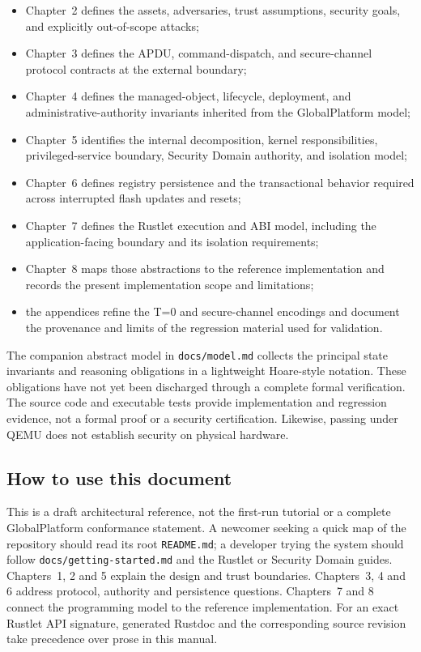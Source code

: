 \begin{itemize}
\item Chapter~2 defines the assets, adversaries, trust assumptions, security
  goals, and explicitly out-of-scope attacks;
\item Chapter~3 defines the APDU, command-dispatch, and secure-channel protocol
  contracts at the external boundary;
\item Chapter~4 defines the managed-object, lifecycle, deployment, and
  administrative-authority invariants inherited from the GlobalPlatform model;
\item Chapter~5 identifies the internal decomposition, kernel responsibilities,
  privileged-service boundary, Security Domain authority, and isolation model;
\item Chapter~6 defines registry persistence and the transactional behavior
  required across interrupted flash updates and resets;
\item Chapter~7 defines the Rustlet execution and ABI model, including the
  application-facing boundary and its isolation requirements;
\item Chapter~8 maps those abstractions to the reference implementation and
  records the present implementation scope and limitations;
\item the appendices refine the T=0 and secure-channel encodings and document
  the provenance and limits of the regression material used for validation.
\end{itemize}

The companion abstract model in \texttt{docs/model.md} collects the principal
state invariants and reasoning obligations in a lightweight Hoare-style
notation. These obligations have not yet been discharged through a complete
formal verification. The source code and executable tests provide implementation
and regression evidence, not a formal proof or a security certification.
Likewise, passing under QEMU does not establish security on physical hardware.

\subsection*{How to use this document}

This is a draft architectural reference, not the first-run tutorial or a
complete GlobalPlatform conformance statement. A newcomer seeking a quick
map of the repository should read its root \texttt{README.md}; a developer
trying the system should follow \texttt{docs/getting-started.md} and the
Rustlet or Security Domain guides. Chapters~1, 2 and 5 explain the design
and trust boundaries. Chapters~3, 4 and 6 address protocol, authority and
persistence questions. Chapters~7 and 8 connect the programming model to the
reference implementation. For an exact Rustlet API signature, generated
Rustdoc and the corresponding source revision take precedence over prose in
this manual.

